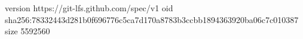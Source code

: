 version https://git-lfs.github.com/spec/v1
oid sha256:78332443d281b0f696776c5ca7d170a8783b3ccbb1894363920ba06c7c010387
size 5592560
